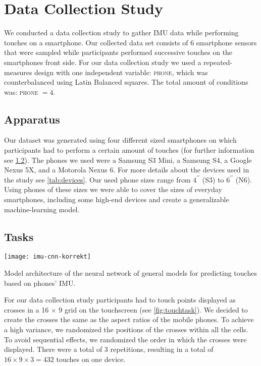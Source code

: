 \section{Data Collection Study}
We conducted a data collection study to gather IMU data while performing touches on a smartphone.
Our collected data set consists of 6 smartphone sensors that were sampled while participants performed successive touches on the smartphones front side. 
For our data collection study we used a repeated-measures design with one independent variable: \textsc{phone}, which was counterbalanced using Latin Balanced squares. 
The total amount of conditions was: \textsc{phone} $ = 4$.

\subsection{Apparatus}
Our dataset was generated using four different sized smartphones on which participants had to perform a certain amount of touches (for further information see \cref{sec:tasks}).
The phones we used were a Samsung S3 Mini, a Samsung S4, a Google Nexus 5X, and a Motorola Nexus 6.
For more details about the devices used in the study see \cref{tab:devices}.
Our used phone sizes range from $ 4^{\prime\prime} $ (S3) to $ 6^{\prime\prime} $ (N6). 
Using phones of these sizes we were able to cover the sizes of everyday smartphones, including some high-end devices and create a generalizable machine-learning model.



\subsection{Tasks}
\label{sec:tasks}
\begin{marginfigure}
	\vspace{-3.5cm}
	\texttt{[image: imu-cnn-korrekt]}
	\caption[Model architecture]{Model architecture of the neural network of general models for predicting touches based on phones' IMU.}
	\label{fig:model_architecture}
\end{marginfigure}
For our data collection study participants had to touch points displayed as crosses in a 16 $ \times $ 9 grid on the touchscreen (see \cref{fig:touchtask}). 
We decided to create the crosses the same as the aspect ratios of the mobile phones.
To achieve a high variance, we randomized the positions of the crosses within all the cells.
To avoid sequential effects, we randomized the order in which the crosses were displayed.
There were a total of 3 repetitions, resulting in a total  of $ 16 \times 9 \times 3 = 432 $ touches on one device.

